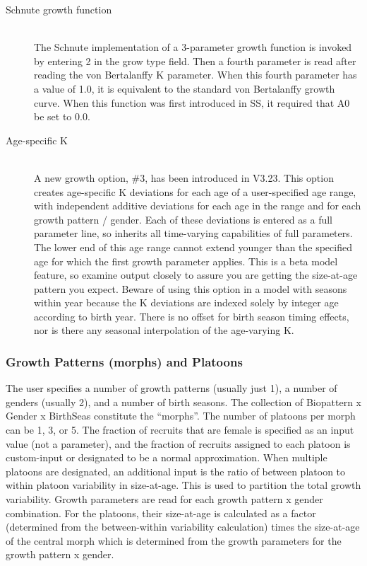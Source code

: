 \begin{description}
	\item[Schnute growth function]\hfil\\
	The Schnute implementation of a 3-parameter growth function is invoked by entering 2 in the grow type field.  Then a fourth parameter is read after reading the von Bertalanffy K parameter.  When this fourth parameter has a value of 1.0, it is equivalent to the standard von Bertalanffy growth curve.  When this function was first introduced in SS, it required that A0 be set to 0.0.
	\item[Age-specific K]\hfil\\
	A new growth option, \#3, has been introduced in V3.23.  This option creates age-specific K deviations for each age of a user-specified age range, with independent additive deviations for each age in the range and for each growth pattern / gender.  Each of these deviations is entered as a full parameter line, so inherits all time-varying capabilities of full parameters.  The lower end of this age range cannot extend younger than the specified age for which the first growth parameter applies.  This is a beta model feature, so examine output closely to assure you are getting the size-at-age pattern you expect.  Beware of using this option in a model with seasons within year because the K deviations are indexed solely by integer age according to birth year.  There is no offset for birth season timing effects, nor is there any seasonal interpolation of the age-varying K.
\end{description}

\subsubsection{Growth Patterns (morphs) and Platoons}
The user specifies a number of growth patterns (usually just 1), a number of genders (usually 2), and a number of birth seasons.  The collection of Bio\textunderscore pattern x Gender x BirthSeas constitute the “morphs”.  The number of platoons per morph can be 1, 3, or 5.  The fraction of recruits that are female is specified as an input value (not a parameter), and the fraction of recruits assigned to each platoon is custom-input or designated to be a normal approximation.  When multiple platoons are designated, an additional input is the ratio of between platoon to within platoon variability in size-at-age.  This is used to partition the total growth variability.  Growth parameters are read for each growth pattern x gender combination.  For the platoons, their size-at-age is calculated as a factor (determined from the between-within variability calculation) times the size-at-age of the central morph which is determined from the growth parameters for the growth pattern x gender.

